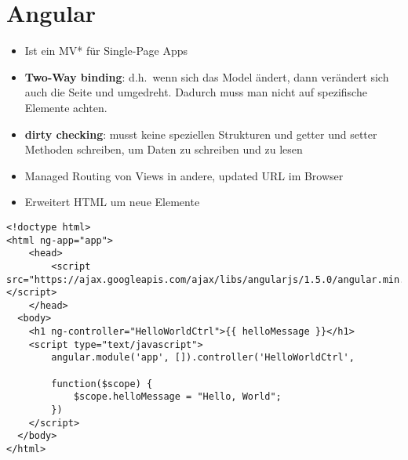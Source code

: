 \def\home{../../styles}

















\usepackage[strings]{underscore} %





\section{Angular}
\begin{itemize}
  \item Ist ein MV* für Single-Page Apps
  \item \textbf{Two-Way binding}: d.h.\ wenn sich das Model ändert, dann verändert sich auch die Seite und umgedreht. Dadurch muss man nicht auf spezifische Elemente achten.
  \item \textbf{dirty checking}: musst keine speziellen Strukturen und getter und setter Methoden schreiben, um Daten zu schreiben und zu lesen
  \item Managed Routing von Views in andere, updated URL im Browser
  \item Erweitert HTML um neue Elemente
\end{itemize}

\begin{verbatim}
<!doctype html>
<html ng-app="app">
    <head>
        <script src="https://ajax.googleapis.com/ajax/libs/angularjs/1.5.0/angular.min.js"></script>
    </head>
  <body>
    <h1 ng-controller="HelloWorldCtrl">{{ helloMessage }}</h1>
    <script type="text/javascript">
        angular.module('app', []).controller('HelloWorldCtrl',

        function($scope) {
            $scope.helloMessage = "Hello, World";
        })
    </script>
  </body>
</html>
\end{verbatim}

